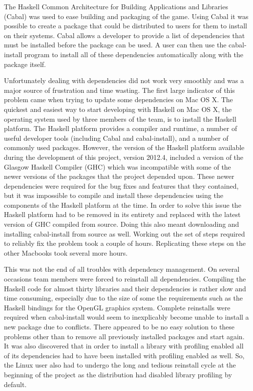 The Haskell Common Architecture for Building Applications and Libraries (Cabal) was used to ease
building and packaging of the game. Using Cabal it was possible to create a package that could be
distributed to users for them to install on their systems. Cabal allows a developer to provide a
list of dependencies that must be installed before the package can be used. A user can then use
the cabal-install program to install all of these dependencies automatically along with the package
itself.

Unfortunately dealing with dependencies did not work very smoothly and was a major source of
frustration and time wasting. The first large indicator of this problem came when trying to
update some dependencies on Mac OS X. The quickest and easiest way to start developing with Haskell on
Mac OS X, the operating system used by three members of the team, is to install the Haskell platform.
The Haskell platform provides a compiler and runtime, a number of useful developer tools (including
Cabal and cabal-install), and a number of commonly used packages. However, the version of the
Haskell platform available during the development of this project, version 2012.4, included a
version of the Glasgow Haskell Compiler (GHC) which was incompatible with some of the newer
versions of the packages that the project depended upon. These newer dependencies were required
for the bug fixes and features that they contained, but it was impossible to compile and install
these dependencies using the components of the Haskell platform at the time. In order to solve
this issue the Haskell platform had to be removed in its entirety and replaced with the latest
version of GHC compiled from source. Doing this also meant downloading and installing cabal-install
from source as well. Working out the set of steps required to reliably fix the problem took
a couple of hours. Replicating these steps on the other Macbooks took several more hours.

This was not the end of all troubles with dependency management. On several occasions team
members were forced to reinstall all dependencies. Compiling the Haskell code for almost thirty
libraries and their dependencies is rather slow and time consuming, especially due to the size
of some the requirements such as the Haskell bindings for the OpenGL graphics system.
Complete reinstalls were required when cabal-install would seem to inexplicably become unable
to install a new package due to conflicts. There appeared to be no easy solution to these
problems other than to remove all previously installed packages and start again. It was also
discovered that in order to install a library with profiling enabled all of its dependencies
had to have been installed with profiling enabled as well. So, the Linux user also had to
undergo the long and tedious reinstall cycle at the beginning of the project as the distribution
had disabled library profiling by default.
